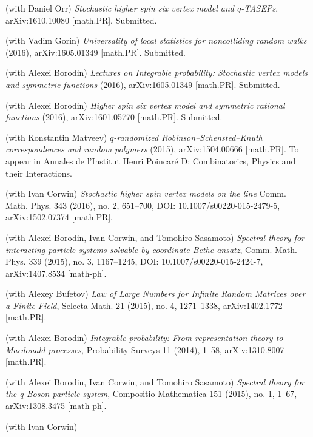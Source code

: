 \documentclass[letterpaper,11pt]{article}
\begin{document}
\begin{etaremune}
    \renewcommand{\labelenumi}{[\theenumi]}
    \item (with Daniel Orr)
		\emph{Stochastic higher spin six vertex model and $q$-TASEPs}, arXiv:1610.10080 [math.PR]. Submitted.
    \item (with Vadim Gorin)
      \emph{Universality of local statistics for noncolliding random walks} (2016), 
      arXiv:1605.01349 [math.PR]. Submitted.
    \item (with Alexei Borodin) 
    \emph{Lectures on Integrable probability: Stochastic vertex models and symmetric functions}
    (2016), arXiv:1605.01349 [math.PR]. Submitted.
    \item (with Alexei Borodin)
    \emph{Higher spin six vertex model and symmetric rational functions}
    (2016),
    arXiv:1601.05770 [math.PR]. Submitted.
    \item (with Konstantin Matveev)
    \emph{$q$-randomized Robinson--Schensted--Knuth correspondences and random polymers}
    (2015),
    arXiv:1504.00666 [math.PR]. 
    To appear in 
    Annales de l'Institut Henri Poincar\'e D:
    Combinatorics, Physics and their Interactions.
    \item (with Ivan Corwin)
    \emph{Stochastic higher spin vertex models on the line}
    Comm. Math. Phys. 
    343 (2016), no. 2, 
    651--700,
    DOI: 10.1007/s00220-015-2479-5,
    arXiv:1502.07374 [math.PR].
    \item (with Alexei Borodin, Ivan Corwin, and Tomohiro Sasamoto)
    \emph{Spectral theory for interacting particle systems solvable by coordinate Bethe ansatz}, 
    Comm. Math. Phys.
    339 (2015), no. 3, 
    1167--1245,
    DOI: 10.1007/s00220-015-2424-7,
    arXiv:1407.8534 [math-ph].
    \item (with Alexey Bufetov)
    \emph{Law of Large Numbers for Infinite Random Matrices over a Finite Field}, 
    Selecta Math. 21 (2015), no. 4, 
    1271--1338,
    arXiv:1402.1772 [math.PR].
    \item (with Alexei Borodin) 
    \emph{Integrable probability: From representation theory to Macdonald processes}, 
    Probability Surveys 11 (2014), 1--58, arXiv:1310.8007 [math.PR]. 
    \item (with Alexei Borodin, Ivan Corwin, and Tomohiro Sasamoto)
    \emph{Spectral theory for the q-Boson particle system},
    Compositio Mathematica 151 (2015), no. 1, 1--67,
    arXiv:1308.3475 [math-ph]. 
    \item (with Ivan Corwin)

\end{etaremune}
\end{document}
